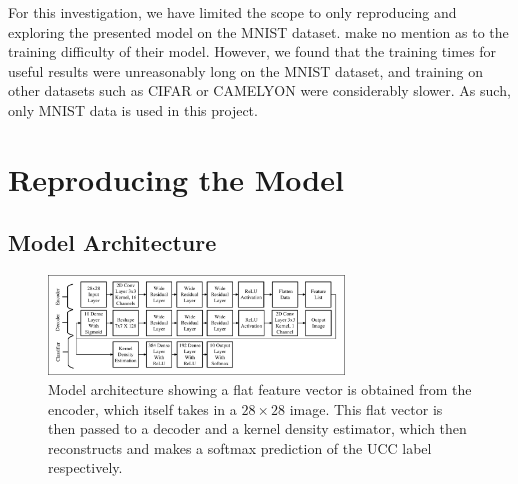 \documentclass{article} %
\begin{document}
For this investigation, we have limited the scope to only reproducing and exploring the presented model on the MNIST dataset. \cite{Oner2019} make no mention as to the training difficulty of their model. However, we found that the training times for useful results were unreasonably long on the MNIST dataset, and training on other datasets such as CIFAR or CAMELYON were considerably slower. As such, only MNIST data is used in this project.

\section{Reproducing the Model} %

\subsection{Model Architecture} %
\label{sec:architecture}
\begin{figure}[htbp]
    \centering
    \includegraphics[width=0.7\textwidth]{images/modelarc.pdf}
    \caption{Model architecture showing a flat feature vector is obtained from the encoder, which itself takes in a $28\times28$ image. This flat vector is then passed to a decoder and a kernel density estimator, which then reconstructs and makes a softmax prediction of the UCC label respectively.}
    \label{fig:final}
\end{figure}
\end{document}
